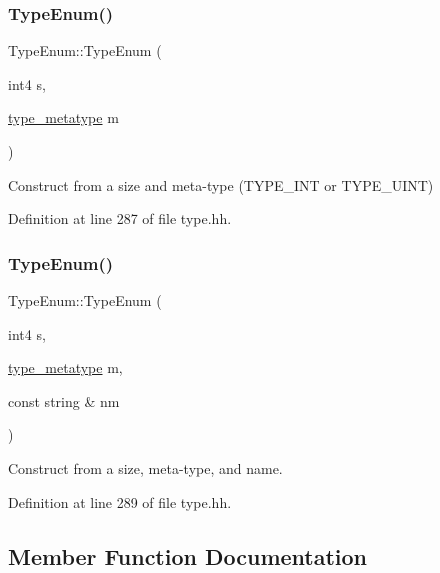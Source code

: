 \subsubsection{\texorpdfstring{TypeEnum()}{TypeEnum()}\hspace{0.1cm}{\footnotesize\ttfamily [2/3]}}
{\footnotesize\ttfamily Type\+Enum\+::\+Type\+Enum (\begin{DoxyParamCaption}\item[{int4}]{s,  }\item[{\mbox{\hyperlink{type_8hh_aef6429f2523cdf4d415ba04a0209e61f}{type\+\_\+metatype}}}]{m }\end{DoxyParamCaption})\hspace{0.3cm}{\ttfamily [inline]}}



Construct from a size and meta-\/type (T\+Y\+P\+E\+\_\+\+I\+NT or T\+Y\+P\+E\+\_\+\+U\+I\+NT) 



Definition at line 287 of file type.\+hh.

\mbox{\label{class_type_enum_a89a591b999e4df06cf4d9896c11369e2}} 
\subsubsection{\texorpdfstring{TypeEnum()}{TypeEnum()}\hspace{0.1cm}{\footnotesize\ttfamily [3/3]}}
{\footnotesize\ttfamily Type\+Enum\+::\+Type\+Enum (\begin{DoxyParamCaption}\item[{int4}]{s,  }\item[{\mbox{\hyperlink{type_8hh_aef6429f2523cdf4d415ba04a0209e61f}{type\+\_\+metatype}}}]{m,  }\item[{const string \&}]{nm }\end{DoxyParamCaption})\hspace{0.3cm}{\ttfamily [inline]}}



Construct from a size, meta-\/type, and name. 



Definition at line 289 of file type.\+hh.



\subsection{Member Function Documentation}
\mbox{\label{class_type_enum_afd8ca15a5bda006a1d65737b1e3109e1}} 
